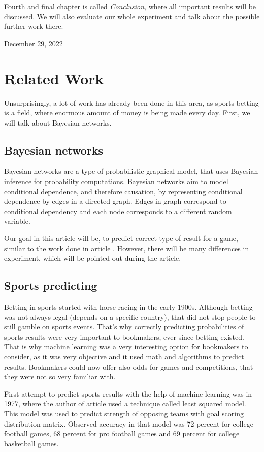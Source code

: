 \documentclass[conference]{IEEEtran}
\begin{document}
Fourth and final chapter is called \emph{Conclusion}, where all important results will be 
discussed. We will also evaluate our whole experiment and talk about the possible further work 
there.
 
\hfill December 29, 2022

\section{Related Work}

Unsurprisingly, a lot of work has already been done in this area, as sports betting is a field,
where enormous amount of money is being made every day. First, we will talk about Bayesian networks.

\subsection{Bayesian networks}

Bayesian networks are a type of probabilistic graphical model, that uses Bayesian 
inference for probability computations. Bayesian networks aim to model conditional 
dependence, and therefore causation, by representing conditional dependence by 
edges in a directed graph. Edges in graph correspond to conditional dependency and 
each node corresponds to a different random variable.

Our goal in this article will be, to predict correct type of result for a game, similar 
to the work done in article \cite{Razali_2017}. However, there will be many 
differences in experiment, which will be pointed out during the article.

\subsection{Sports predicting}

Betting in sports started with horse racing in the early 1900s. Although betting was 
not always legal (depends on a specific country), that did not stop people to still
gamble on sports events. That's why correctly predicting probabilities of sports 
results were very important to bookmakers, ever since betting existed. That is why
machine learning was a very interesting option for bookmakers to consider, as it 
was very objective and it used math and algorithms to predict results. Bookmakers 
could now offer also odds for games and competitions, that they were not so very familiar 
with.

First attempt to predict sports results with the help of machine learning was in
1977, where the author of article \cite{Stefani_1977} used a technique called least squared model.
This model was used to predict strength of opposing teams with goal scoring distribution matrix.
Observed accuracy in that model was 72 percent for college football games, 68 percent for pro 
football games and 69 percent for college basketball games.
\end{document}
